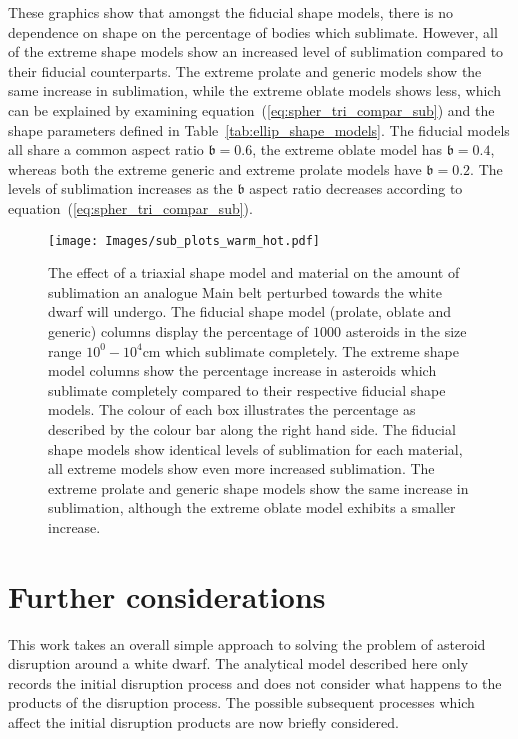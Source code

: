 \documentclass[fleqn,usenatbib]{mnras}
\begin{document}
These graphics show that amongst the fiducial shape models, there is no dependence on shape on the percentage of bodies which sublimate.
However, all of the extreme shape models show an increased level of sublimation compared to their fiducial counterparts. 
The extreme prolate and generic models show the same increase in sublimation, while the extreme oblate models shows less, which can be explained by examining equation~(\ref{eq:spher_tri_compar_sub}) and the shape parameters defined in Table~\ref{tab:ellip_shape_models}.
The fiducial models all share a common aspect ratio $\mathfrak{b} = 0.6$, the extreme oblate model has $\mathfrak{b} = 0.4$, whereas both the extreme generic and extreme prolate models have $\mathfrak{b}= 0.2$. The levels of sublimation increases as the $\mathfrak{b}$ aspect ratio decreases according to equation~(\ref{eq:spher_tri_compar_sub}).
\begin{figure*} %
    \centering
    \texttt{[image: Images/sub\_plots\_warm\_hot.pdf]}
    \caption{The effect of a triaxial shape model and material on the amount of sublimation an analogue Main belt perturbed towards the white dwarf will undergo.
    The fiducial shape model (prolate, oblate and generic) columns display the percentage of $1000$ asteroids in the size range $10^0-10^4$cm which sublimate completely. 
    The extreme shape model columns show the percentage increase in asteroids which sublimate completely compared to their respective fiducial shape models. 
    The colour of each box illustrates the percentage as described by the colour bar along the right hand side. 
    The fiducial shape models show identical levels of sublimation for each material, all extreme models show even more increased sublimation. 
    The extreme prolate and generic shape models show the same increase in sublimation, although the extreme oblate model exhibits a smaller increase.}
    \label{fig:SubShape}
\end{figure*}



\section{Further considerations} \label{sec:further}
This work takes an overall simple approach to solving the problem of asteroid disruption around a white dwarf. 
The analytical model described here only records the initial disruption process and does not consider what happens to the products of the disruption process. 
The possible subsequent processes which affect the initial disruption products are now briefly considered.
\end{document}
